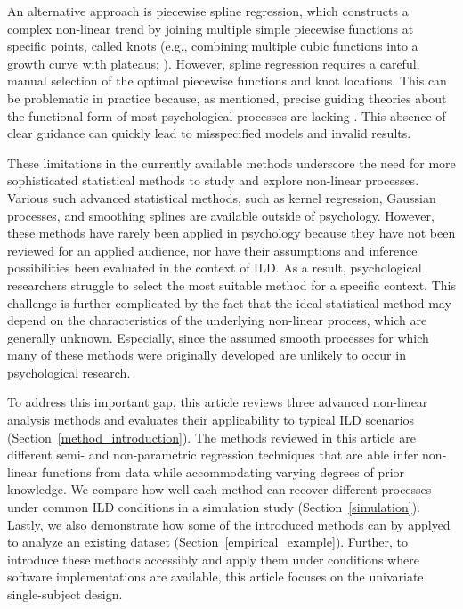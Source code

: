 \documentclass[man, floatsintext]{apa7}
\begin{document}
An alternative approach is piecewise spline regression, which constructs a
complex non-linear trend by joining multiple simple piecewise functions at
specific points, called knots (e.g., combining multiple cubic functions into a
growth curve with plateaus; \textcite{tsay_nonlinear_2019}). However, spline
regression requires a careful, manual selection of the optimal piecewise
functions and knot locations. This can be problematic in practice because, as
mentioned, precise guiding theories about the functional form of most
psychological processes are lacking \parencite{tan_time-varying_2011}. This
absence of clear guidance can quickly lead to misspecified models and invalid
results.

These limitations in the currently available methods underscore the need for
more sophisticated statistical methods to study and explore non-linear
processes. Various such advanced statistical methods, such as kernel
regression, Gaussian processes, and smoothing splines are available outside of
psychology. However, these methods have rarely been applied in psychology
because they have not been reviewed for an applied audience, nor have their
assumptions and inference possibilities been evaluated in the context of ILD.\@
As a result, psychological researchers struggle to select the most suitable
method for a specific context. This challenge is further complicated by the
fact that the ideal statistical method may depend on the characteristics of the
underlying non-linear process, which are generally unknown. Especially, since
the assumed smooth processes for which many of these methods were originally
developed are unlikely to occur in psychological research.

To address this important gap, this article reviews three advanced non-linear
analysis methods and evaluates their applicability to typical ILD scenarios
(Section~\ref{method_introduction}). The methods reviewed in this article are
different semi- and non-parametric regression techniques that are able infer
non-linear functions from data while accommodating varying degrees of prior
knowledge. We compare how well each method can recover different processes
under common ILD conditions in a simulation study (Section~\ref{simulation}).
Lastly, we also demonstrate how some of the introduced methods can by applyed
to analyze an existing dataset (Section~\ref{empirical_example}). Further, to
introduce these methods accessibly and apply them under conditions where
software implementations are available, this article focuses on the univariate
single-subject design.
\end{document}
